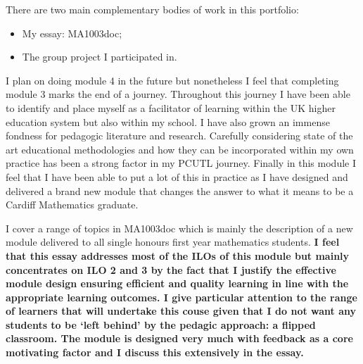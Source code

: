 \documentclass{article}
\begin{document}
There are two main complementary bodies of work in this portfolio:

\begin{itemize}
    \item My essay: MA1003doc;
    \item The group project I participated in.
\end{itemize}

I plan on doing module 4 in the future but nonetheless I feel that completing module 3 marks the end of a journey. Throughout this journey I have been able to identify and place myself as a facilitator of learning within the UK higher education system but also within my school. I have also grown an immense fondness for pedagogic literature and research. Carefully considering state of the art educational methodologies and how they can be incorporated within my own practice has been a strong factor in my PCUTL journey. Finally in this module I feel that I have been able to put a lot of this in practice as I have designed and delivered a brand new module that changes the answer to what it means to be a Cardiff Mathematics graduate.

I cover a range of topics in MA1003doc which is mainly the description of a new module delivered to all single honours first year mathematics students. \textbf{I feel that this essay addresses most of the ILOs of this module but mainly concentrates on ILO 2 and 3 by the fact that I justify the effective module design ensuring efficient and quality learning in line with the appropriate learning outcomes. I give particular attention to the range of learners that will undertake this couse given that I do not want any students to be `left behind' by the pedagic approach: a flipped classroom. The module is designed very much with feedback as a core motivating factor and I discuss this extensively in the essay.}
\end{document}
